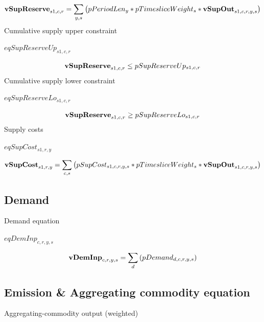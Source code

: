 \documentclass{article}
\begin{document}
\begin{dmath}
{\bf vSupReserve}_{s1,c,r}  =  \sum_{y,s}{\left(pPeriodLen_{y}*pTimesliceWeight_{s}*{\bf vSupOut}_{s1,c,r,y,s}\right)}
\end{dmath}
Cumulative supply upper constraint







$eqSupReserveUp_{s1,c,r}$





\begin{dmath}
{\bf vSupReserve}_{s1,c,r}  \le  pSupReserveUp_{s1,c,r}
\end{dmath}
Cumulative supply lower constraint







$eqSupReserveLo_{s1,c,r}$





\begin{dmath}
{\bf vSupReserve}_{s1,c,r}  \ge  pSupReserveLo_{s1,c,r}
\end{dmath}
Supply costs







$eqSupCost_{s1,r,y}$





\begin{dmath}
{\bf vSupCost}_{s1,r,y}  =  \sum_{c,s}{\left(pSupCost_{s1,c,r,y,s}*pTimesliceWeight_{s}*{\bf vSupOut}_{s1,c,r,y,s}\right)}
\end{dmath}
\subsection*{Demand}
Demand equation







$eqDemInp_{c,r,y,s}$





\begin{dmath}
{\bf vDemInp}_{c,r,y,s}  =  \sum_{d}{\left(pDemand_{d,c,r,y,s}\right)}
\end{dmath}
\subsection*{Emission \& Aggregating commodity equation}
Aggregating-commodity output (weighted)
\end{document}
